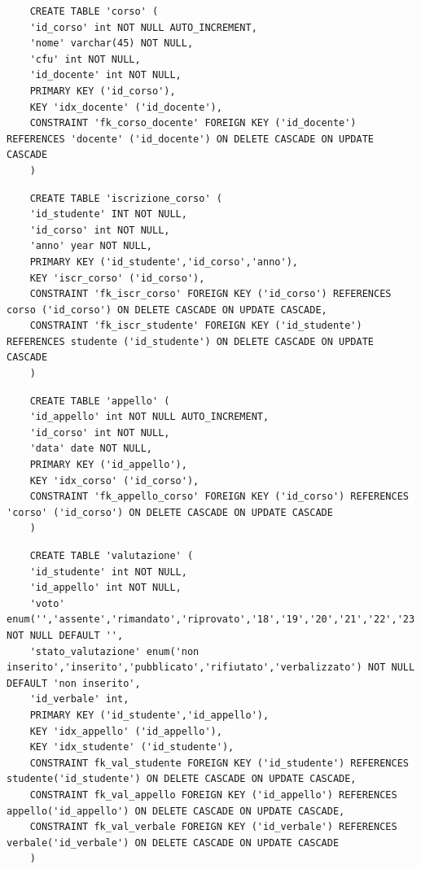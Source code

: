 \documentclass[a4paper,12pt]{scrreprt}
\begin{document}
\begin{lstlisting}
    CREATE TABLE 'corso' (
    'id_corso' int NOT NULL AUTO_INCREMENT,
    'nome' varchar(45) NOT NULL,
    'cfu' int NOT NULL,
    'id_docente' int NOT NULL,
    PRIMARY KEY ('id_corso'),
    KEY 'idx_docente' ('id_docente'),
    CONSTRAINT 'fk_corso_docente' FOREIGN KEY ('id_docente') REFERENCES 'docente' ('id_docente') ON DELETE CASCADE ON UPDATE CASCADE
    )
\end{lstlisting}


\begin{lstlisting}
    CREATE TABLE 'iscrizione_corso' (
    'id_studente' INT NOT NULL,
    'id_corso' int NOT NULL,
    'anno' year NOT NULL,
    PRIMARY KEY ('id_studente','id_corso','anno'),
    KEY 'iscr_corso' ('id_corso'),
    CONSTRAINT 'fk_iscr_corso' FOREIGN KEY ('id_corso') REFERENCES corso ('id_corso') ON DELETE CASCADE ON UPDATE CASCADE,
    CONSTRAINT 'fk_iscr_studente' FOREIGN KEY ('id_studente') REFERENCES studente ('id_studente') ON DELETE CASCADE ON UPDATE CASCADE
    )
\end{lstlisting}


\begin{lstlisting}
    CREATE TABLE 'appello' (
    'id_appello' int NOT NULL AUTO_INCREMENT,
    'id_corso' int NOT NULL,
    'data' date NOT NULL,
    PRIMARY KEY ('id_appello'),
    KEY 'idx_corso' ('id_corso'),
    CONSTRAINT 'fk_appello_corso' FOREIGN KEY ('id_corso') REFERENCES 'corso' ('id_corso') ON DELETE CASCADE ON UPDATE CASCADE
    )
\end{lstlisting}

\begin{lstlisting}
    CREATE TABLE 'valutazione' (
    'id_studente' int NOT NULL,
    'id_appello' int NOT NULL,
    'voto' enum('','assente','rimandato','riprovato','18','19','20','21','22','23','24','25','26','27','28','29','30','30L') NOT NULL DEFAULT '',
    'stato_valutazione' enum('non inserito','inserito','pubblicato','rifiutato','verbalizzato') NOT NULL DEFAULT 'non inserito', 
    'id_verbale' int,
    PRIMARY KEY ('id_studente','id_appello'),
    KEY 'idx_appello' ('id_appello'),
    KEY 'idx_studente' ('id_studente'),
    CONSTRAINT fk_val_studente FOREIGN KEY ('id_studente') REFERENCES studente('id_studente') ON DELETE CASCADE ON UPDATE CASCADE,
    CONSTRAINT fk_val_appello FOREIGN KEY ('id_appello') REFERENCES appello('id_appello') ON DELETE CASCADE ON UPDATE CASCADE,
    CONSTRAINT fk_val_verbale FOREIGN KEY ('id_verbale') REFERENCES verbale('id_verbale') ON DELETE CASCADE ON UPDATE CASCADE
    )
\end{lstlisting}
\end{document}
